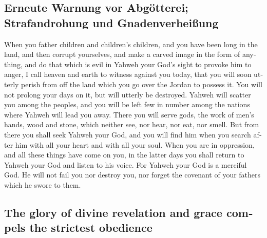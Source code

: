 \begin{paracol}{2}
\begin{otherlanguage}{english}
\hypertarget{erneute-warnung-vor-abguxf6tterei-strafandrohung-und-gnadenverheiuxdfung-1}{%
\subsection{Erneute Warnung vor Abgötterei; Strafandrohung und
Gnadenverheißung}\label{erneute-warnung-vor-abguxf6tterei-strafandrohung-und-gnadenverheiuxdfung-1}}

 When you father children and children's children, and
you have been long in the land, and then corrupt yourselves, and make a
carved image in the form of anything, and do that which is evil in
Yahweh your God's sight to provoke him to anger,  I call
heaven and earth to witness against you today, that you will soon
utterly perish from off the land which you go over the Jordan to possess
it. You will not prolong your days on it, but will utterly be destroyed.
 Yahweh will scatter you among the peoples, and you will
be left few in number among the nations where Yahweh will lead you away.
 There you will serve gods, the work of men's hands, wood
and stone, which neither see, nor hear, nor eat, nor smell.
 But from there you shall seek Yahweh your God, and you
will find him when you search after him with all your heart and with all
your soul.  When you are in oppression, and all these
things have come on you, in the latter days you shall return to Yahweh
your God and listen to his voice.  For Yahweh your God is
a merciful God. He will not fail you nor destroy you, nor forget the
covenant of your fathers which he swore to them.

\hypertarget{the-glory-of-divine-revelation-and-grace-compels-the-strictest-obedience}{%
\subsection{The glory of divine revelation and grace compels the
strictest
obedience}\label{the-glory-of-divine-revelation-and-grace-compels-the-strictest-obedience}}


\end{otherlanguage}
\end{paracol}
